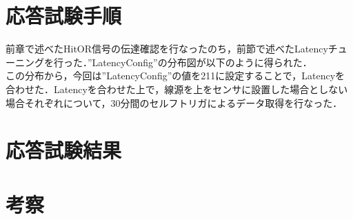 \section{応答試験手順}
前章で述べたHitOR信号の伝達確認を行なったのち，前節で述べたLatencyチューニングを行った．''LatencyConfig''の分布図が以下のように得られた．\\
この分布から，今回は''LatencyConfig''の値を211に設定することで，Latencyを合わせた．Latencyを合わせた上で，線源を上をセンサに設置した場合としない場合それぞれについて，30分間のセルフトリガによるデータ取得を行なった．

\section{応答試験結果}
\section{考察}
